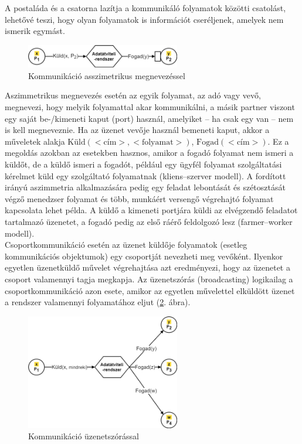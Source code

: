 \documentclass[tikz,12pt,margin=0px]{article}
\begin{document}
    \noindent A postaláda és a csatorna lazítja a kommunikáló folyamatok közötti csatolást, lehetővé teszi, hogy olyan folyamatok is információt cseréljenek, amelyek nem ismerik egymást.

    \begin{figure}[H]
        \centering
        \includegraphics[width=0.6\textwidth]{img/asymmetric_communication.png}
        \caption{Kommunikáció asszimetrikus megnevezéssel}
        \label{asymmetric_communication}
    \end{figure}

    \noindent Aszimmetrikus megnevezés esetén az egyik folyamat, az adó vagy vevő, megnevezi, hogy melyik folyamattal akar kommunikálni, a másik partner viszont egy saját be-/kimeneti kaput (port) használ, amelyiket – ha csak egy van – nem is kell megneveznie. Ha az üzenet vevője használ bemeneti kaput, akkor a műveletek alakja $\text{Küld}(<\text{cím}>,<\text{folyamat}>)$, $\text{Fogad}(<\text{cím}>)$. Ez a megoldás azokban az esetekben hasznos, amikor a fogadó folyamat nem ismeri a küldőt, de a küldő ismeri a fogadót, például egy ügyfél folyamat szolgáltatási kérelmet küld egy szolgáltató folyamatnak (kliens–szerver modell). A fordított irányú aszimmetria alkalmazására pedig egy feladat lebontását és szétosztását végző menedzser folyamat és több, munkáért versengő végrehajtó folyamat kapcsolata lehet példa. A küldő a kimeneti port­jára küldi az elvégzendő feladatot tartalmazó üzenetet, a fogadó pedig az első ráérő feldolgozó lesz (farmer–worker modell).\\

    \noindent Csoportkommunikáció esetén az üzenet küldője folyamatok (esetleg kommunikációs objektumok) egy csoportját nevezheti meg vevőként. Ilyenkor egyetlen üzenetküldő művelet végrehajtása azt eredményezi, hogy az üzenetet a csoport valamennyi tagja megkapja. Az üzenetszórás (broadcasting) logikailag a csoportkommunikáció azon esete, amikor az egyetlen művelettel elküldött üzenet a rendszer valamennyi folyamatához eljut (\ref{broadcasting_communication}. ábra).\\

    \begin{figure}[H]
        \centering
        \includegraphics[width=0.6\textwidth]{img/broadcasting_communication.png}
        \caption{Kommunikáció üzenetszórással}
        \label{broadcasting_communication}
    \end{figure}
\end{document}
